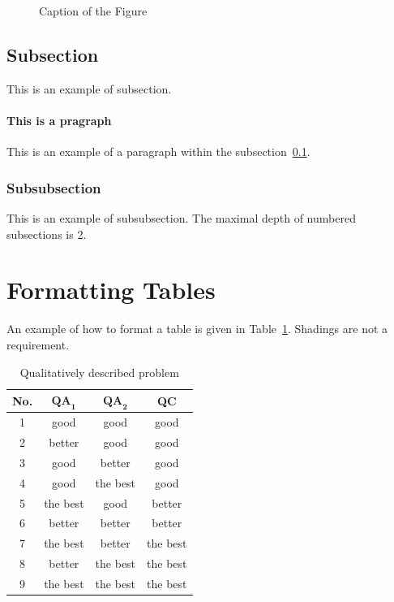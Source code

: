 \begin{figure}[!htb]
{\label{fig:QQ_ginipop}
}
\caption{Caption of the Figure}
\label{fig:QQ_different_weights}
\end{figure}


\subsection{Subsection}
\label{sec:subsection}
This is an example of subsection.

\paragraph{This is a pragraph}
This is an example of a paragraph within the subsection~\ref{sec:subsection}.

\subsubsection{Subsubsection}
This is an example of subsubsection. The maximal depth of numbered subsections is 2.

\section{Formatting Tables}
An example of how to format a table is given in Table~\ref{tbl:QQqual}. Shadings are not a requirement.

\begin{table}[!ht]
\centering
\caption{Qualitatively described problem}
\begin{tabular}{cccc}
\toprule 
\textbf{No.} & ${{\mathbf {QA}}}_{{\mathbf 1}}$\textbf{} & ${{\mathbf {QA}}}_{{\mathbf 2}}$\textbf{} & 		\textbf{QC} \\
\midrule
1 & good & good  & good \\ 
2 & better & good & good \\ 
3 & good & better & good \\ 
4 & good & the best & good \\ 
\rowcolor[gray]{0.9} 5 & the best & good & better\\ 
\rowcolor[gray]{0.9} 6 & better & better & better \\ 
7 & the best & better & the best \\ 
8 & better & the best & the best \\ 
9 & the best & the best & the best \\ 
\bottomrule 
\end{tabular}
\label{tbl:QQqual}
\hspace{0.5cm}
\end{table}


%
%
%

